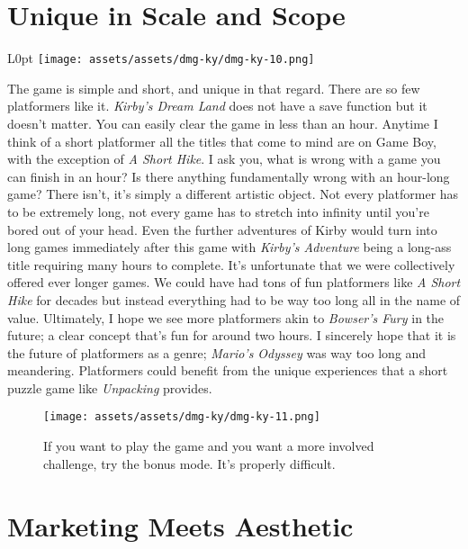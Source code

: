 \documentclass{book}
\begin{document}
\FloatBarrier\needspace{10mm}\section*{Unique in Scale and Scope}\nopagebreak[4]

\begin{wrapfigure}{L}{0pt} \texttt{[image: assets/assets/dmg-ky/dmg-ky-10.png]}\end{wrapfigure}
The game is simple and short, and unique in that regard. There are so few platformers like it. \emph{Kirby’s Dream Land} does not have a save function but it doesn’t matter. You can easily clear the game in less than an hour. Anytime I think of a short platformer all the titles that come to mind are on Game Boy, with the exception of \emph{A Short Hike}. I ask you, what is wrong with a game you can finish in an hour? Is there anything fundamentally wrong with an hour-long game? There isn’t, it’s simply a different artistic object. Not every platformer has to be extremely long, not every game has to stretch into infinity until you’re bored out of your head. Even the further adventures of Kirby would turn into long games immediately after this game with \emph{Kirby’s Adventure} being a long-ass title requiring many hours to complete. It’s unfortunate that we were collectively offered ever longer games. We could have had tons of fun platformers like \emph{A Short Hike} for decades but instead everything had to be way too long all in the name of value. Ultimately, I hope we see more platformers akin to \emph{Bowser’s Fury} in the future; a clear concept that’s fun for around two hours. I sincerely hope that it is the future of platformers as a genre; \emph{Mario’s Odyssey} was way too long and meandering. Platformers could benefit from the unique experiences that a short puzzle game like \emph{Unpacking} provides.

\begin{figure}[hbt]
\vskip 10pt
\centering \texttt{[image: assets/assets/dmg-ky/dmg-ky-11.png]}\par\pagetwodescription If you want to play the game and you want a more involved challenge, try the bonus mode. It’s properly difficult.
\vskip 6pt
\end{figure}

\FloatBarrier\needspace{10mm}\section*{Marketing Meets Aesthetic}\nopagebreak[4]
\end{document}
